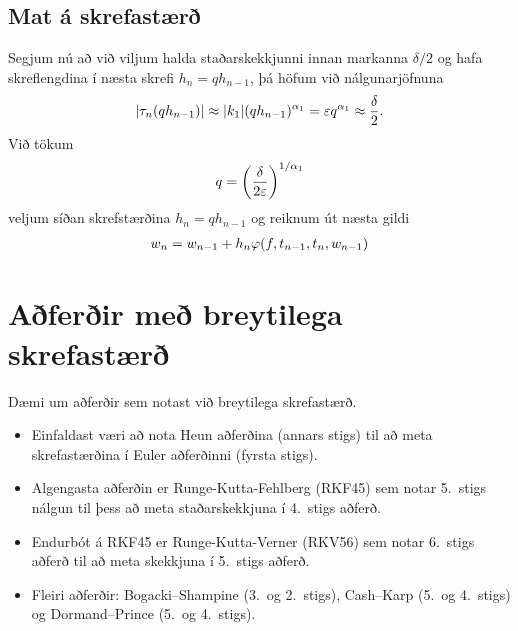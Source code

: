 \documentclass[letterpaper,10pt,icelandic]{sphinxmanual}
\begin{document}
\subsection{Mat á skrefastærð}
\label{kafli06:mat-a-skrefastaer}
Segjum nú að við viljum halda staðarskekkjunni innan markanna
\(\delta/2\) og hafa skreflengdina í næsta skrefi
\(h_{n}=qh_{n-1}\), þá höfum við nálgunarjöfnuna
\begin{gather}
\begin{split}|\tau_n(qh_{n-1})|\approx |k_1|(qh_{n-1})^{\alpha_1}=
\varepsilon {q^{\alpha_1}} \approx  \frac{\delta} 2.\end{split}\notag
\end{gather}
Við tökum
\begin{gather}
\begin{split}q = \left(\frac{\delta}{2\varepsilon}\right)^{1/{\alpha_1}}\end{split}\notag
\end{gather}
veljum síðan skrefstærðina \(h_n = qh_{n-1}\) og reiknum út næsta
gildi
\begin{gather}
\begin{split}w_{n} = w_{n-1} + h_n\varphi(f,t_{n-1},t_n,w_{n-1})\end{split}\notag
\end{gather}

\section{Aðferðir með breytilega skrefastærð}
\label{kafli06:aferir-me-breytilega-skrefastaer}\label{kafli06:index-14}
Dæmi um aðferðir sem notast við breytilega skrefastærð.
\begin{itemize}
\item {} 
Einfaldast væri að nota Heun aðferðina (annars stigs) til að meta
skrefastærðina í Euler aðferðinni (fyrsta stigs).

\item {} 
Algengasta aðferðin er Runge-Kutta-Fehlberg (RKF45) sem notar
5. stigs nálgun til þess að meta staðarskekkjuna í 4. stigs aðferð.

\item {} 
Endurbót á RKF45 er Runge-Kutta-Verner (RKV56) sem notar 6. stigs
aðferð til að meta skekkjuna í 5. stigs aðferð.

\item {} 
Fleiri aðferðir: Bogacki–Shampine (3. og 2. stigs), Cash–Karp (5. og
4. stigs) og Dormand–Prince (5. og 4. stigs).

\end{itemize}
\end{document}
